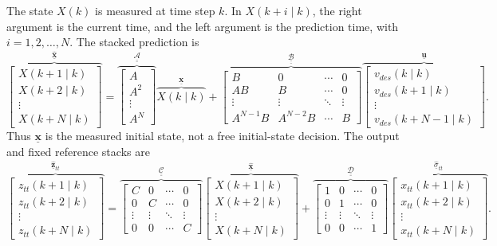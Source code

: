 \documentclass{article}
\newcommand{\uv}{\underline{\mathbf{u}}}
\newcommand{\xv}{\underline{\mathbf{x}}}
\newcommand{\xh}{\underline{\hat{\mathbf{x}}}}
\newcommand{\zh}{\underline{\hat{\mathbf{z}}}_{tt}}
\newcommand{\sh}{\underline{\hat{\sigma}}}
\newcommand{\Am}{\underline{\underline{\mathcal A}}}
\newcommand{\Bm}{\underline{\underline{\mathcal B}}}
\newcommand{\Cm}{\underline{\underline{\mathcal C}}}
\newcommand{\Dm}{\underline{\underline{\mathcal D}}}
\begin{document}
The state \(X(k)\) is measured at time step \(k\). In \(X(k+i\mid k)\), the right argument is the current time, and the left argument is the prediction time, with \(i=1,2,\ldots,N\). The stacked prediction is
\begin{equation}
\overbrace{\begin{bmatrix}
X(k+1\mid k)\\X(k+2\mid k)\\\vdots\\X(k+N\mid k)
\end{bmatrix}}^{\xh}
=
\overbrace{\begin{bmatrix}A\\A^2\\\vdots\\A^N\end{bmatrix}}^{\Am}
\overbrace{X(k\mid k)}^{\xv}
+
\overbrace{\begin{bmatrix}
B&0&\cdots&0\\
AB&B&\cdots&0\\
\vdots&\vdots&\ddots&\vdots\\
A^{N-1}B&A^{N-2}B&\cdots&B
\end{bmatrix}}^{\Bm}
\overbrace{\begin{bmatrix}
v_{des}(k\mid k)\\v_{des}(k+1\mid k)\\\vdots\\v_{des}(k+N-1\mid k)
\end{bmatrix}}^{\uv}.
\tag{25}
\end{equation}
Thus \(\xv\) is the measured initial state, not a free initial-state decision. The output and fixed reference stacks are
\begin{equation}
\overbrace{\begin{bmatrix}
z_{tt}(k+1\mid k)\\z_{tt}(k+2\mid k)\\\vdots\\z_{tt}(k+N\mid k)
\end{bmatrix}}^{\zh}
=
\overbrace{\begin{bmatrix}
C&0&\cdots&0\\0&C&\cdots&0\\\vdots&\vdots&\ddots&\vdots\\0&0&\cdots&C
\end{bmatrix}}^{\Cm}
\overbrace{\begin{bmatrix}
X(k+1\mid k)\\X(k+2\mid k)\\\vdots\\X(k+N\mid k)
\end{bmatrix}}^{\xh}
+
\overbrace{\begin{bmatrix}
1&0&\cdots&0\\0&1&\cdots&0\\\vdots&\vdots&\ddots&\vdots\\0&0&\cdots&1
\end{bmatrix}}^{\Dm}
\overbrace{\begin{bmatrix}
x_{tt}(k+1\mid k)\\x_{tt}(k+2\mid k)\\\vdots\\x_{tt}(k+N\mid k)
\end{bmatrix}}^{\sh_{tt}}.
\tag{26}
\end{equation}
\end{document}
